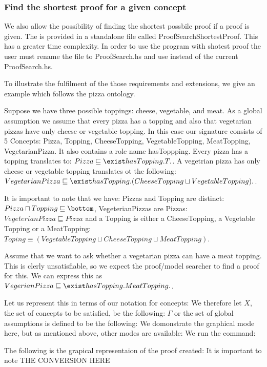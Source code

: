 \subsubsection*{Find the shortest proof for a given concept}
We also allow the possibility of finding the shortest possbile proof if a proof is given. The is provided in a standalone file called ProofSearchShortestProof. This has a greater time complexity. In order to use the program with shotest proof the user must rename the file to ProofSearch.hs and use instead of the current ProofSearch.hs. 

To illustrate the fulfilment of the those requirements and extensions, we give an example which follows the pizza ontology.

Suppose we have three possible toppings: cheese, vegetable, and meat. As a global assumption we assume that every pizza has a topping and also that vegetarian pizzas have only cheese or vegetable topping.
In this case our signature consists of 5 Concepts: Pizza, Topping, CheeseTopping, VegetableTopping, MeatTopping, VegetarianPizza. It also contains a role name hasToppping.
Every pizza has a topping translates to: $Pizza \sqsubseteq \exist hasTopping.T.$. A vegetrian pizza has only cheese or vegetable topping translates ot the following: $VegetarianPizza \sqsubseteq \exist hasTopping.(CheeseTopping \sqcup VegetableTopping).$. 

It is important to note that we have:
Pizzas and Topping are distinct: $Pizza \sqcap Topping \sqsubseteq \bottom$, VegeterianPizzas are Pizzas: $VegeterianPizza \sqsubseteq Pizza$ and a Topping is either a CheeseTopping, a Vegetable Topping or a MeatTopping: $Toping \equiv (VegetableTopping \sqcup CheeseTopping \sqcup MeatTopping)$. 

Assume that we want to ask whether a vegetarian pizza can have a meat topping. This is clerly unsatisfiable, so we expect the proof/model searcher to find a proof for this.
We can express this as $VegerianPizza \sqsubseteq \exist hasTopping.MeatTopping.$.

Let us represent this in terms of our notation for concepts:
We therefore let $X$, the set of concepts to be satisfied, be the following: 
$\Gamma$ or the set of global assumptions is defined to be the following: 
We domonstrate the graphical mode here, but as mentioned above, other modes are available:
We run the command: 

The following is the grapical representaion of the proof created:
It is important to note THE CONVERSION HERE


